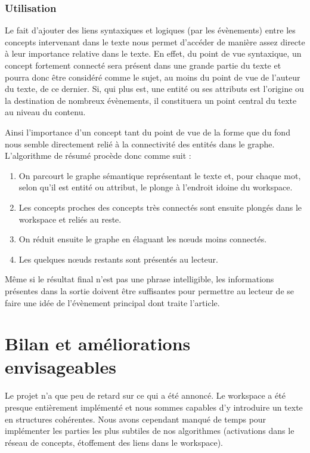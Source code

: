 \documentclass[a4paper, 12pt]{article}
\begin{document}

\subsubsection{Utilisation}

Le fait d'ajouter des liens syntaxiques et logiques (par les évènements) entre les concepts intervenant dans le texte nous permet d'accéder de manière assez directe à leur importance relative dans le texte. En effet, du point de vue syntaxique, un concept fortement connecté sera présent dans une grande partie du texte et pourra donc être considéré comme le sujet, au moins du point de vue de l'auteur du texte, de ce dernier. Si, qui plus est, une entité ou ses attributs est l'origine ou la destination de nombreux évènements, il constituera un point central du texte au niveau du contenu.

Ainsi l'importance d'un concept tant du point de vue de la forme que du fond nous semble directement relié à la connectivité des entités dans le graphe. L'algorithme de résumé procède donc comme suit :

\begin{enumerate}
	\item On parcourt le graphe sémantique représentant le texte et, pour chaque mot, selon qu'il est entité ou attribut, le plonge à l'endroit idoine du workspace.
	\item Les concepts proches des concepts très connectés sont ensuite plongés dans le workspace et reliés au reste.
	\item On réduit ensuite le graphe en élaguant les nœuds moins connectés.
	\item Les quelques nœuds restants sont présentés au lecteur.
\end{enumerate}

Même si le résultat final n'est pas une phrase intelligible, les informations présentes dans la sortie doivent être suffisantes pour permettre au lecteur de se faire une idée de l'évènement principal dont traite l'article.


\section{Bilan et améliorations envisageables}

Le projet n'a que peu de retard sur ce qui a été annoncé. Le workspace a été presque entièrement implémenté et nous sommes capables d'y introduire un texte en structures cohérentes. Nous avons cependant manqué de temps pour implémenter les parties les plus subtiles de nos algorithmes (activations dans le réseau de concepts, étoffement des liens dans le workspace).
\end{document}
